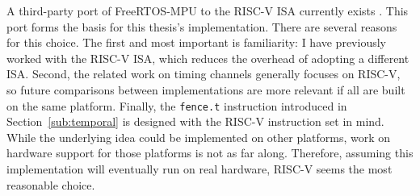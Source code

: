 A third-party port of FreeRTOS-MPU to the RISC-V ISA currently exists
\cite{FreeRTOSCommunitySupportedDemosRISCV_RV32_MPU_QEMU_VIRT_GCCmain}. This
port forms the basis for this thesis's implementation. There are several reasons
for this choice. The first and most important is familiarity: I have previously
worked with the RISC-V ISA, which reduces the overhead of adopting a different
ISA. Second, the related work on timing channels generally focuses on RISC-V, so
future comparisons between implementations are more relevant if all are built on
the same platform. Finally, the \texttt{fence.t} instruction introduced in
Section~\ref{sub:temporal} is designed with the RISC-V instruction set in mind.
While the underlying idea could be implemented on other platforms, work on
hardware support for those platforms is not as far along. Therefore, assuming
this implementation will eventually run on real hardware, RISC-V seems the most
reasonable choice.


